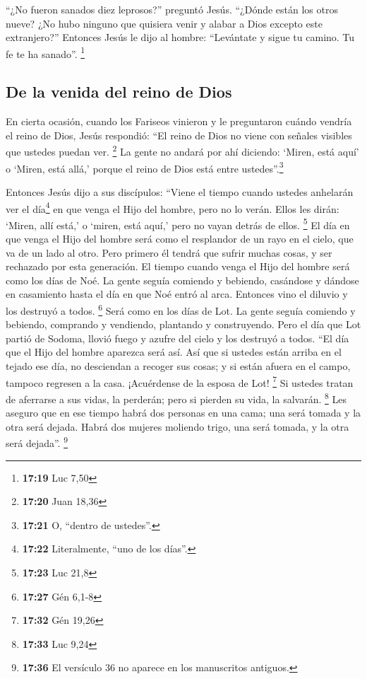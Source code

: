  ``¿No fueron sanados diez leprosos?'' preguntó Jesús.
``¿Dónde están los otros nueve?  ¿No hubo ninguno que
quisiera venir y alabar a Dios excepto este extranjero?''
 Entonces Jesús le dijo al hombre: ``Levántate y sigue tu
camino. Tu fe te ha sanado''. \footnote{\textbf{17:19} Luc 7,50}

\hypertarget{de-la-venida-del-reino-de-dios}{%
\subsection{De la venida del reino de
Dios}\label{de-la-venida-del-reino-de-dios}}

 En cierta ocasión, cuando los Fariseos vinieron y le
preguntaron cuándo vendría el reino de Dios, Jesús respondió: ``El reino
de Dios no viene con señales visibles que ustedes puedan ver.
\footnote{\textbf{17:20} Juan 18,36}  La gente no andará
por ahí diciendo: `Miren, está aquí' o `Miren, está allá,' porque el
reino de Dios está entre ustedes''.\footnote{\textbf{17:21} O, ``dentro
  de ustedes''.}

 Entonces Jesús dijo a sus discípulos: ``Viene el tiempo
cuando ustedes anhelarán ver el día\footnote{\textbf{17:22}
  Literalmente, ``uno de los días''.} en que venga el Hijo del hombre,
pero no lo verán.  Ellos les dirán: `Miren, allí está,' o
`miren, está aquí,' pero no vayan detrás de ellos. \footnote{\textbf{17:23}
  Luc 21,8}  El día en que venga el Hijo del hombre será
como el resplandor de un rayo en el cielo, que va de un lado al otro.
 Pero primero él tendrá que sufrir muchas cosas, y ser
rechazado por esta generación.  El tiempo cuando venga el
Hijo del hombre será como los días de Noé.  La gente
seguía comiendo y bebiendo, casándose y dándose en casamiento hasta el
día en que Noé entró al arca. Entonces vino el diluvio y los destruyó a
todos. \footnote{\textbf{17:27} Gén 6,1-8}  Será como en
los días de Lot. La gente seguía comiendo y bebiendo, comprando y
vendiendo, plantando y construyendo.  Pero el día que Lot
partió de Sodoma, llovió fuego y azufre del cielo y los destruyó a
todos.  ``El día que el Hijo del hombre aparezca será
así.  Así que si ustedes están arriba en el tejado ese
día, no desciendan a recoger sus cosas; y si están afuera en el campo,
tampoco regresen a la casa.  ¡Acuérdense de la esposa de
Lot! \footnote{\textbf{17:32} Gén 19,26}  Si ustedes
tratan de aferrarse a sus vidas, la perderán; pero si pierden su vida,
la salvarán. \footnote{\textbf{17:33} Luc 9,24}  Les
aseguro que en ese tiempo habrá dos personas en una cama; una será
tomada y la otra será dejada.  Habrá dos mujeres moliendo
trigo, una será tomada, y la otra será dejada''. 
\footnote{\textbf{17:36} El versículo 36 no aparece en los manuscritos
  antiguos.}

